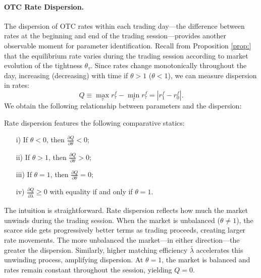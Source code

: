 \documentclass[12pt,american,english,notitlepage]{article}
\begin{document}
\FloatBarrier

\paragraph*{OTC Rate Dispersion.}

The dispersion of OTC rates within each trading day---the difference
between rates at the beginning and end of the trading session---provides
another observable moment for parameter identification. Recall from
Proposition \ref{prop:} that the equilibrium rate varies
during the trading session according to market evolution of the tightness
$\theta_{\tau}$. Since rates change monotonically throughout the
day, increasing (decreasing) with time if $\theta>1$ ($\theta<1$),
we can measure dispersion in rates:
\[
Q\equiv \max_{\tau} r^{f}_{\tau} - \min_{\tau} r^{f}_{\tau}=\left|r_{1}^{f}-r_{0}^{f}\right|.
\]
We obtain the following relationship between parameters and the dispersion:

\begin{corollary}
    \label{prop:dispersion.compstats}
Rate dispersion features the following comparative statics:
\begin{enumerate}
\item [i)] If $\theta<0$, then $\frac{\partial Q}{\partial\theta}<0$;
\item [ii)] If $\theta>1$, then $\frac{\partial Q}{\partial\theta}>0$;
\item [iii)] If $\theta=1$, then $\frac{\partial Q}{\partial\theta}=0$;

\item [iv)] $\frac{\partial Q}{\partial\bar{\lambda}}\geq0$ with equality if
and only if $\theta=1$.
\end{enumerate}
\end{corollary}

The intuition is straightforward. Rate dispersion reflects how much
the market \textquotedbl unwinds\textquotedbl{} during the trading
session. When the market is unbalanced ($\theta\not=1$), the scarce
side gets progressively better terms as trading proceeds, creating
larger rate movements. The more unbalanced the market---in either
direction---the greater the dispersion. Similarly, higher matching
efficiency $\bar{\lambda}$ accelerates this unwinding process, amplifying
dispersion. At $\theta=1$, the market is balanced and rates remain
constant throughout the session, yielding $Q=0$.
\end{document}
